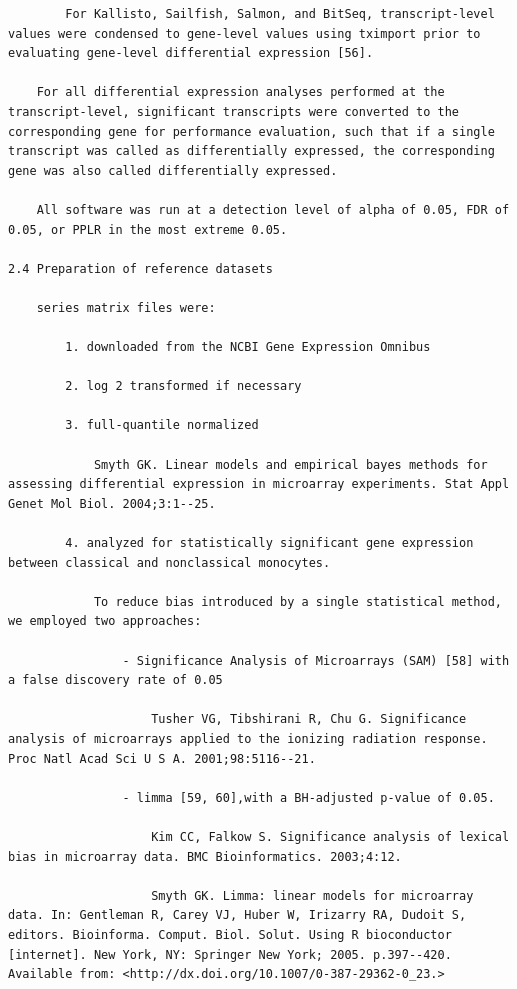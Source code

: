 \documentclass[
]{book}
\begin{document}
\begin{verbatim}
        For Kallisto, Sailfish, Salmon, and BitSeq, transcript-level values were condensed to gene-level values using tximport prior to evaluating gene-level differential expression [56].

    For all differential expression analyses performed at the transcript-level, significant transcripts were converted to the corresponding gene for performance evaluation, such that if a single transcript was called as differentially expressed, the corresponding gene was also called differentially expressed.

    All software was run at a detection level of alpha of 0.05, FDR of 0.05, or PPLR in the most extreme 0.05.

2.4 Preparation of reference datasets

    series matrix files were:

        1. downloaded from the NCBI Gene Expression Omnibus

        2. log 2 transformed if necessary

        3. full-quantile normalized

            Smyth GK. Linear models and empirical bayes methods for assessing differential expression in microarray experiments. Stat Appl Genet Mol Biol. 2004;3:1--25.

        4. analyzed for statistically significant gene expression between classical and nonclassical monocytes.

            To reduce bias introduced by a single statistical method, we employed two approaches:

                - Significance Analysis of Microarrays (SAM) [58] with a false discovery rate of 0.05

                    Tusher VG, Tibshirani R, Chu G. Significance analysis of microarrays applied to the ionizing radiation response. Proc Natl Acad Sci U S A. 2001;98:5116--21.

                - limma [59, 60],with a BH-adjusted p-value of 0.05.

                    Kim CC, Falkow S. Significance analysis of lexical bias in microarray data. BMC Bioinformatics. 2003;4:12.

                    Smyth GK. Limma: linear models for microarray data. In: Gentleman R, Carey VJ, Huber W, Irizarry RA, Dudoit S, editors. Bioinforma. Comput. Biol. Solut. Using R bioconductor [internet]. New York, NY: Springer New York; 2005. p.397--420. Available from: <http://dx.doi.org/10.1007/0-387-29362-0_23.>


\end{verbatim}
\end{document}
